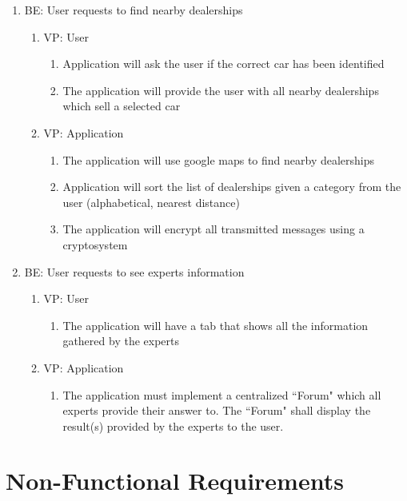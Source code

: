 \documentclass[12pt]{article}
\begin{document}
\begin{enumerate}
\begin{enumerate}
\begin{enumerate}
        \end{enumerate}
    \end{enumerate}
    \item BE: User requests to find nearby dealerships
    \begin{enumerate}
        \item VP: User
        \begin{enumerate}
            \item Application will ask the user if the correct car has been identified
            \item The application will provide the user with all nearby dealerships which sell a selected car
        \end{enumerate}
        \item VP: Application
        \begin{enumerate}
            \item The application will use google maps to find nearby dealerships
            \item Application will sort the list of dealerships given a category from the user (alphabetical, nearest distance)
            \item The application will encrypt all transmitted messages using a cryptosystem
        \end{enumerate}
    \end{enumerate}
    \item BE: User requests to see experts information
    \begin{enumerate}
        \item VP: User
        \begin{enumerate}
            \item The application will have a tab that shows all the information gathered by the experts

        \end{enumerate}
        \item VP: Application
        \begin{enumerate}
            \item The application must implement a centralized “Forum" which all experts provide their answer to. The “Forum" shall display the result(s) provided by the experts to the user.
        \end{enumerate}
    \end{enumerate}
\end{enumerate}

\section{Non-Functional Requirements}
\end{document}
